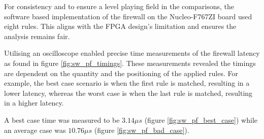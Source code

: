 For consistency and to ensure a level playing field in the comparisons, the software based implementation of the firewall on the Nucleo-F767ZI board used eight rules. This aligns with the FPGA design's limitation and ensures the analysis remains fair.

Utilising an oscilloscope enabled precise time measurements of the firewall latency as found in figure \ref{fig:sw_pf_timings}. These measurements revealed the timings are dependent on the quantity and the positioning of the applied rules. For example, the best case scenario is when the first rule is matched, resulting in a lower latency, whereas the worst case is when the last rule is matched, resulting in a higher latency.

A best case time was measured to be $3.14\mu s$ (figure \ref{fig:sw_pf_best_case}) while an average case was $10.76\mu s$ (figure \ref{fig:sw_pf_bad_case}).


